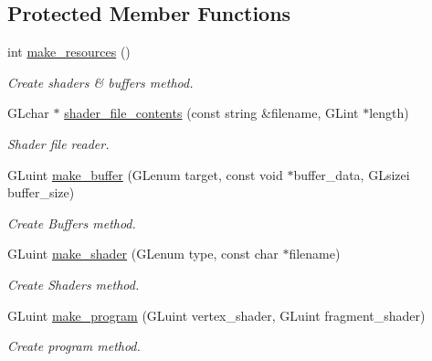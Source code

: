 \subsection*{Protected Member Functions}
\begin{DoxyCompactItemize}
\item 
int \hyperlink{classGameAsset_aa26d85233ece476d599adf90074e9568}{make\-\_\-resources} ()
\begin{DoxyCompactList}\small\item\em Create shaders \& buffers method. \end{DoxyCompactList}\item 
G\-Lchar $\ast$ \hyperlink{classGameAsset_a08c617aafc70dcba441f53260f1bb09f}{shader\-\_\-file\-\_\-contents} (const string \&filename, G\-Lint $\ast$length)
\begin{DoxyCompactList}\small\item\em Shader file reader. \end{DoxyCompactList}\item 
G\-Luint \hyperlink{classGameAsset_adfe27369433f07092b08f24b0feedfc9}{make\-\_\-buffer} (G\-Lenum target, const void $\ast$buffer\-\_\-data, G\-Lsizei buffer\-\_\-size)
\begin{DoxyCompactList}\small\item\em Create Buffers method. \end{DoxyCompactList}\item 
G\-Luint \hyperlink{classGameAsset_ac728e885b52c93c3e4976a339de54545}{make\-\_\-shader} (G\-Lenum type, const char $\ast$filename)
\begin{DoxyCompactList}\small\item\em Create Shaders method. \end{DoxyCompactList}\item 
G\-Luint \hyperlink{classGameAsset_a9d9574a21cf6b52f7a825879ca50b19d}{make\-\_\-program} (G\-Luint vertex\-\_\-shader, G\-Luint fragment\-\_\-shader)
\begin{DoxyCompactList}\small\item\em Create program method. \end{DoxyCompactList}\end{DoxyCompactItemize}
